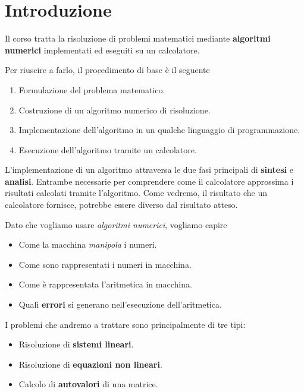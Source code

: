 \chapter{Introduzione}
Il corso tratta la risoluzione di problemi matematici mediante \textbf{algoritmi numerici} implementati
ed eseguiti su un calcolatore.

Per riuscire a farlo, il procedimento di base è il seguente
\begin{enumerate}
	\item Formulazione del problema matematico.
	\item Costruzione di un algoritmo numerico di risoluzione.
	\item Implementazione dell'algoritmo in un qualche linguaggio di programmazione.
	\item Esecuzione dell'algoritmo tramite un calcolatore.
\end{enumerate}
L'implementazione di un algoritmo attraversa le due fasi principali di \textbf{sintesi} e \textbf{analisi}.
Entrambe necessarie per comprendere come il calcolatore approssima i risultati calcolati tramite l'algoritmo.
Come vedremo, il risultato che un calcolatore fornisce, potrebbe essere diverso dal risultato atteso.

Dato che vogliamo usare \emph{algoritmi numerici}, vogliamo capire
\begin{itemize}
	\item Come la macchina \emph{manipola} i numeri.
	\item Come sono rappresentati i numeri in macchina.
	\item Come è rappresentata l'aritmetica in macchina.
	\item Quali \textbf{errori} si generano nell'esecuzione dell'aritmetica.
\end{itemize}
I problemi che andremo a trattare sono principalmente di tre tipi:
\begin{itemize}
	\item Risoluzione di \textbf{sistemi lineari}.
	\item Risoluzione di \textbf{equazioni non lineari}.
	\item Calcolo di \textbf{autovalori} di una matrice.
\end{itemize}